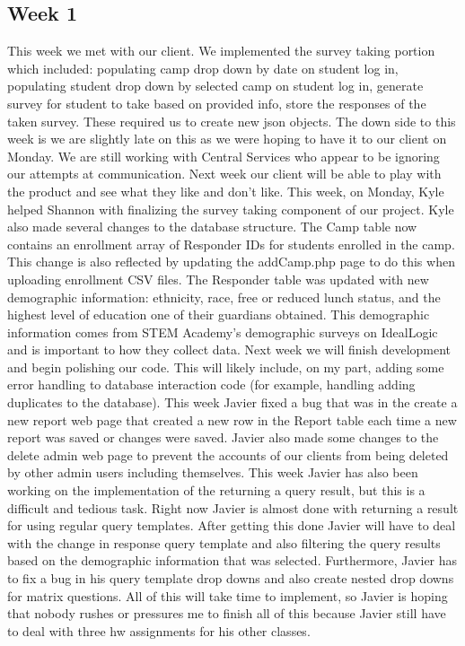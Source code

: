 \documentclass[letterpaper,10pt,serif,draftclsnofoot,onecolumn,compsoc,titlepage]{IEEEtran}
\begin{document}
\subsection{Week 1}
This week we met with our client. We implemented the survey taking portion which included: 
populating camp drop down by date on student log in,
populating student drop down by selected camp on student log in,
generate survey for student to take based on provided info,
store the responses of the taken survey. These required us to create new json objects. 
The down side to this week is we are slightly late on this as we were hoping to have it to our client on Monday.
 We are still working with Central Services who appear to be ignoring our attempts at communication.
 Next week our client will be able to play with the product and see what they like and don't like.
 This week, on Monday, Kyle helped Shannon with finalizing the survey taking component of our project.
Kyle also made several changes to the database structure. The Camp table now contains an enrollment array
 of Responder IDs for students enrolled in the camp. This change is also reflected by updating the
 addCamp.php page to do this when uploading enrollment CSV files. The Responder table was updated
 with new demographic information: ethnicity, race, free or reduced lunch status, and the highest
 level of education one of their guardians obtained. This demographic information comes from STEM Academy's
 demographic surveys on IdealLogic and is important to how they collect data.
Next week we will finish development and begin polishing our code. This will likely include,
 on my part, adding some error handling to database interaction code (for example, handling adding 
 duplicates to the database).
This week Javier fixed a bug that was in the create a new report web page that created a new row in 
the Report table each time a new report was saved or changes were saved. Javier also made some changes
 to the delete admin web page to prevent the accounts of our clients from being deleted by other admin
 users including themselves. This week Javier has also been working on the implementation of the returning
 a query result, but this is a difficult and tedious task. Right now Javier is almost done with returning
 a result for using regular query templates. After getting this done Javier will have to deal with the
 change in response query template and also filtering the query results based on the demographic
 information that was selected. Furthermore, Javier has to fix a bug in his query template drop downs
 and also create nested drop downs for matrix questions. All of this will take time to implement, so Javier
 is hoping that nobody rushes or pressures me to finish all of this because Javier still have to deal with
 three hw assignments for his other classes.
\end{document}
